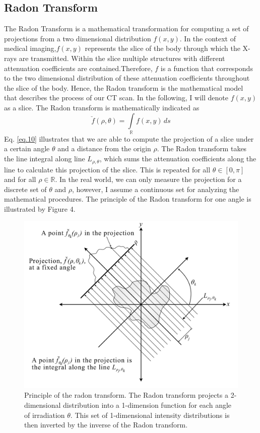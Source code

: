 \documentclass[12pt]{article}
\begin{document}
\subsection{Radon Transform}
The Radon Transform is a mathematical transformation for computing a set of projections from a two dimensional distribution $f(x,y)$. In the context of medical imaging,$f(x,y)$ represents the slice of the body through which the X-rays are transmitted. Within the slice multiple structures with different attenuation coefficients are contained.Therefore, $f$ is a function that corresponds to the two dimensional distribution of these attenuation coefficients throughout the slice of the body. Hence, the Radon transform is the mathematical model that describes the process of our CT scan. In the following, I will denote $f(x,y)$ as a slice. The Radon transform is mathematically indicated as
\begin{equation}\label{eq.10}
	\breve{f}(\rho, \theta)= \int\limits_{\mathbb{R}} f(x,y)\, ds
\end{equation}
Eq. \ref{eq.10} illustrates that we are able to compute the projection of a slice under a certain angle $\theta$ and a distance from the origin $\rho$. The Radon transform takes the line integral along line $L_{\rho, \theta}$, which sums the attenuation coefficients along the line to calculate this projection of the slice. This is repeated for all $\theta \in [0, \pi]$ and for all $\rho \in \mathbb{R}$. In the real world, we can only measure the projection for a discrete set of $\theta$ and $\rho$, however, I  assume a continuous set for analyzing the mathematical procedures. The principle of the Radon transform for one angle is illustrated by Figure 4.
\begin{figure}[hbt]
	\includegraphics[width= .7\textwidth]{theory/euclidean_radon_space}
	\caption{Principle of the radon transform. The Radon transform projects a 2-dimensional distribution into a 1-dimension function for each angle of irradiation $\theta$. This set of 1-dimensional intensity distributions is then inverted by the inverse of the Radon transform.}
\end{figure}
\end{document}
